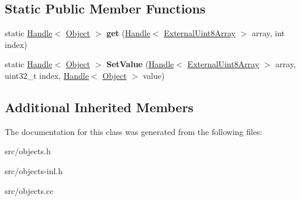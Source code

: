 \subsection*{Static Public Member Functions}
\begin{DoxyCompactItemize}
\item 
\hypertarget{classv8_1_1internal_1_1_external_uint8_array_a7c627c446a61e719738f4f8dad8eae22}{}static \hyperlink{classv8_1_1internal_1_1_handle}{Handle}$<$ \hyperlink{classv8_1_1internal_1_1_object}{Object} $>$ {\bfseries get} (\hyperlink{classv8_1_1internal_1_1_handle}{Handle}$<$ \hyperlink{classv8_1_1internal_1_1_external_uint8_array}{External\+Uint8\+Array} $>$ array, int index)\label{classv8_1_1internal_1_1_external_uint8_array_a7c627c446a61e719738f4f8dad8eae22}

\item 
\hypertarget{classv8_1_1internal_1_1_external_uint8_array_aa90b46656c77418c73cf463b9cf1f6a4}{}static \hyperlink{classv8_1_1internal_1_1_handle}{Handle}$<$ \hyperlink{classv8_1_1internal_1_1_object}{Object} $>$ {\bfseries Set\+Value} (\hyperlink{classv8_1_1internal_1_1_handle}{Handle}$<$ \hyperlink{classv8_1_1internal_1_1_external_uint8_array}{External\+Uint8\+Array} $>$ array, uint32\+\_\+t index, \hyperlink{classv8_1_1internal_1_1_handle}{Handle}$<$ \hyperlink{classv8_1_1internal_1_1_object}{Object} $>$ value)\label{classv8_1_1internal_1_1_external_uint8_array_aa90b46656c77418c73cf463b9cf1f6a4}

\end{DoxyCompactItemize}
\subsection*{Additional Inherited Members}


The documentation for this class was generated from the following files\+:\begin{DoxyCompactItemize}
\item 
src/objects.\+h\item 
src/objects-\/inl.\+h\item 
src/objects.\+cc\end{DoxyCompactItemize}
